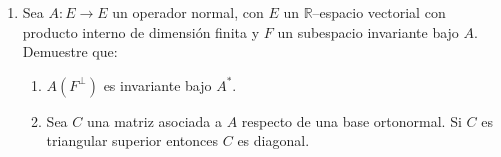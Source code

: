 \documentclass{article}
\begin{document}
\begin{enumerate}
	\item Sea \( A : E \rightarrow E \) un operador normal, con \( E \) un \( \mathbb{R} \)--espacio vectorial con producto interno de dimensión finita y \( F \) un subespacio invariante bajo \( A \). Demuestre que:
	      \begin{enumerate}[label=\alph*)]
		      \item \( A(F^\perp) \) es invariante bajo \( A^* \).
		      \item Sea \( C \) una matriz asociada a \( A \) respecto de una base ortonormal. Si \( C \) es triangular superior entonces \( C \) es diagonal.
	      \end{enumerate}
\end{enumerate}
\end{document}
